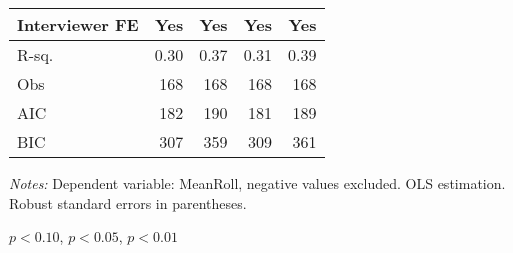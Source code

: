 \begin{table}[htbp]
\begin{threeparttable}
\begin{tabular}{l*{4}{D{.}{.}{-1}}}
Interviewer FE      &                 Yes   &                 Yes   &                 Yes   &                 Yes   \\
\midrule
R-sq.               &                0.30   &                0.37   &                0.31   &                0.39   \\
Obs                 &                 168   &                 168   &                 168   &                 168   \\
AIC                 &                 182   &                 190   &                 181   &                 189   \\
BIC                 &                 307   &                 359   &                 309   &                 361   \\
\bottomrule
\end{tabular}
\begin{tablenotes}
\footnotesize
\flushleft \textit{Notes:} Dependent variable: MeanRoll, negative values excluded. OLS estimation. Robust standard errors in parentheses.
\item \sym{*} \(p<0.10\), \sym{**} \(p<0.05\), \sym{***} \(p<0.01\)
\end{tablenotes}
\end{threeparttable}
\end{table}
